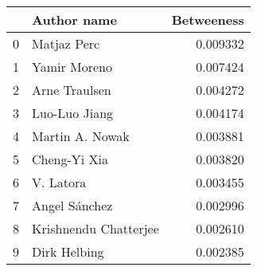\begin{tabular}{llr}
\toprule
{} &            Author name &  Betweeness \\
\midrule
0 &            Matjaz Perc &    0.009332 \\
1 &           Yamir Moreno &    0.007424 \\
2 &          Arne Traulsen &    0.004272 \\
3 &          Luo-Luo Jiang &    0.004174 \\
4 &        Martin A. Nowak &    0.003881 \\
5 &           Cheng-Yi Xia &    0.003820 \\
6 &              V. Latora &    0.003455 \\
7 &          Angel Sánchez &    0.002996 \\
8 &  Krishnendu Chatterjee &    0.002610 \\
9 &           Dirk Helbing &    0.002385 \\
\bottomrule
\end{tabular}
